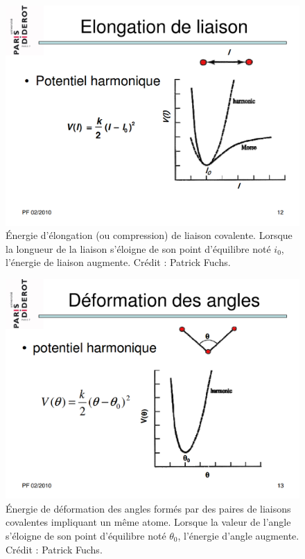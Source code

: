 	\begin{figure}[H]
		\centering
		\includegraphics[width=\textwidth]{figures/ch1/e_bond}
		\caption[Énergie de liaison.]{Énergie d'élongation (ou compression) de liaison covalente. Lorsque la longueur de la liaison s'éloigne de son point d'équilibre noté $i_{0}$, l'énergie de liaison augmente. Crédit : Patrick Fuchs\footnotemark.}
		\label{fig:e_bond}
	\end{figure}
	
	\begin{figure}[H]
		\centering
		\includegraphics[width=\textwidth]{figures/ch1/e_angle}
		\caption[Énergie d'angle.]{Énergie de déformation des angles formés par des paires de liaisons covalentes impliquant un même atome. Lorsque la valeur de l'angle s'éloigne de son point d'équilibre noté $\theta_{0}$, l'énergie d'angle augmente. Crédit : Patrick Fuchs.}
		\label{fig:e_angle}
	\end{figure}
	
